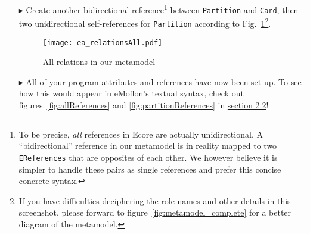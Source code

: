 \begin{itemize}
\item[$\blacktriangleright$] Create another bidirectional reference\footnote{To be precise, \emph{all} references in Ecore are actually unidirectional.
A ``bidirectional'' reference in our metamodel is in reality mapped to two \texttt{EReferences} that are opposites of each other.
We however believe it is simpler to handle these pairs as single references and prefer this concise concrete syntax.} between \texttt{Partition} and
\texttt{Card}, then two unidirectional self-references for \texttt{Partition} according to Fig.~\ref{fig:ereferences_all}\footnote{If you have difficulties
deciphering the role names and other details in this screenshot, please forward to figure~\ref{fig:metamodel_complete} for a better diagram of the metamodel.}.

\begin{figure}[htbp]
	\centering
  \texttt{[image: ea\_relationsAll.pdf]}
	\caption{All relations in our metamodel}
	\label{fig:ereferences_all}
\end{figure}

\FloatBarrier

\item[$\blacktriangleright$] All of your program attributes and references have now been set up. To see how this would appear in eMoflon's textual syntax, check
out figures~\ref{fig:allReferences} and \ref{fig:partitionReferences} in \hyperlink{sec:static tex}{section 2.2}!


\end{itemize}
